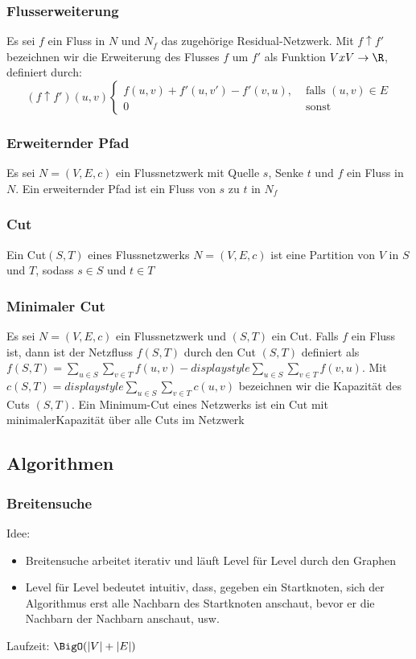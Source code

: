 				\subsubsection{Flusserweiterung}
				Es sei $f$ ein Fluss in $N$ und $N_f$ das zugehörige Residual-Netzwerk. Mit $f\uparrow f'$ bezeichnen wir die Erweiterung des Flusses $f$ um $f'$ als Funktion $VxV\to \R$, definiert durch:
				$$
					(f\uparrow f')(u,v)\begin{cases}
							f(u,v)+f'(u,v')-f'(v,u), & \text{ falls } (u,v)\in E \\
							0 & \text{ sonst}
						\end{cases}
				$$
				\subsubsection{Erweiternder Pfad}
				Es sei $N=(V,E,c)$ ein Flussnetzwerk mit Quelle $s$, Senke $t$ und $f$ ein Fluss in $N$. Ein erweiternder Pfad ist ein Fluss von $s$ zu $t$ in $N_f$
				\subsubsection{Cut}
					Ein Cut$(S,T)$ eines Flussnetzwerks $N=(V,E,c)$ ist eine Partition von $V$ in $S$ und $T$, sodass $s\in S$ und $t\in T$
				\subsubsection{Minimaler Cut}
				Es sei $N=(V,E,c)$ ein Flussnetzwerk und $(S,T)$ ein Cut. Falls $f$ ein Fluss ist, dann ist der Netzfluss $f(S,T)$ durch den Cut $(S,T)$ definiert als $f(S,T)=\displaystyle\sum_{u\in S}\displaystyle\sum_{v\in T}f(u,v)-displaystyle\sum_{u\in S}\displaystyle\sum_{v\in T}f(v,u)$. Mit $c(S,T)=displaystyle\sum_{u\in S}\displaystyle\sum_{v\in T}c(u,v)$ bezeichnen wir die Kapazität des Cuts $(S,T)$. Ein Minimum-Cut eines Netzwerks ist ein Cut mit minimalerKapazität über alle Cuts im Netzwerk
				\subsection{Algorithmen}
	\subsubsection{Breitensuche}
		Idee: 
		\begin{itemize}
		  \item Breitensuche arbeitet iterativ und läuft Level für Level durch den Graphen
		  \item Level für Level bedeutet intuitiv, dass, gegeben ein Startknoten, sich der Algorithmus erst alle Nachbarn des Startknoten anschaut, bevor er die Nachbarn der Nachbarn anschaut, usw.
		\end{itemize}
		Laufzeit: $\BigO(|V|+|E|)$
